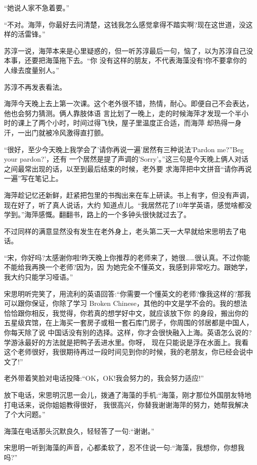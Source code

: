 \documentclass[11pt,a4paper,onecolumn]{article}
\begin{document}
``她说人家不急着要。''

``不对。海萍，你最好去问清楚，这钱我怎么感觉拿得不踏实啊?现在这世道，没这样的活雷锋。''

苏淳一说，海萍本来是心里疑惑的，但一听苏淳最后一句，恼了，以为苏淳自己没本事，还要把海藻拖下去。``你
没有这样的朋友，不代表海藻没有!你不要拿你的人缘去度量别人。''

苏淳不再发表看法。

海萍今天晚上去上第一次课。这个老外很不错，热情，耐心。即便自己不会表达，他也会努力猜测。俩人靠肢体语
言比划了一晚上，走的时候海萍才发现一个半小时的课上了两个小时，时间过得飞快，屋子里温度正合适，而海萍
却热得一身汗，一出门就被冷风激得直打颤。

``很好，至少今天晚上我学会了'请你再说一遍'居然有三种说法\myrule 'Pardon me?''Beg your pardon?'，还有
一个居然是提了声调的'Sorry'。''这三句是今天晚上俩人对话之间最常出现的话，以至到最后结束的时候，老外要
求海萍把中文拼音``请你再说一遍''写在笔记上。

海萍趁记忆还新鲜，赶紧把包里的书掏出来在车上研读。书上有字，但没有声调，现在好了，听了真人说话，大约
知道点儿。``我居然花了10年学英语，感觉啥都没学到。''海萍感慨。翻翻书，路上的一个多钟头很快就过去了。

不过同样的满意显然没有发生在老外身上，老头第二天一大早就给宋思明去了电话。

``宋，你好吗?太感谢你啦!昨天晚上你推荐的老师来了，她很……很认真。不过你能不能给我再换一个老师?因为，因
为她完全不懂英文，我感到非常吃力。跟她学，我大约只能学习哑语。''

宋思明听完笑了，用流利的英语回答:``你需要一个懂英文的老师?像我这样的?那我可以跟你保证，你除了学习
Broken Chinese，其他的中文是学不会的。我的想法恰恰跟你相反，我觉得，你若真的想学好中文，就应该放下你
的身段，搬出你的五星级宾馆，在上海买一套房子或租一套石库门房子，你周围的邻居都是中国人，你每天除了说
中国话没有别的选择。这样，你才会很快融入上海。英语怎么说的?学游泳最好的方法就是把鸭子丢进水里。你呀，
现在只能说是浮在水面上。我看这个老师很好，我很期待再过一段时间见到你的时候，我的老朋友，你已经会说中
文了!''

老外带着笑脸对电话投降:``OK，OK!我会努力的，我会努力适应!''

放下电话，宋思明沉思一会儿，拨通了海藻的手机:``海藻，刚才那位外国朋友特地打电话来，说你姐姐教得很好，
我很高兴，你替我谢谢海萍的努力，她帮我解决了个大问题。''

海藻在电话那头沉默良久，轻轻答了一句:``谢谢。''

宋思明一听到海藻的声音，心都柔软了，忍不住说一句:``海藻，我想你，你想我吗?''
\end{document}
